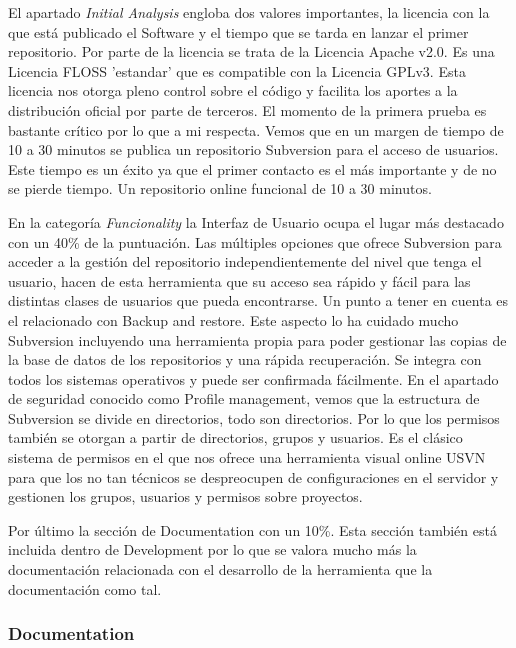 \documentclass[11pt]{scrartcl}
\begin{document}
\par El apartado \emph{Initial Analysis} engloba dos valores importantes, la licencia con la que está publicado el Software y el tiempo que se tarda en lanzar el primer repositorio. Por parte de la licencia se trata de la Licencia Apache v2.0. Es una Licencia FLOSS 'estandar' que es compatible con la Licencia GPLv3. Esta licencia nos otorga pleno control sobre el c\'odigo y facilita los aportes a la distribuci\'on oficial por parte de terceros.
El momento de la primera prueba es bastante cr\'itico por lo que a mi respecta. Vemos que en un margen de tiempo de 10 a 30 minutos se publica un repositorio Subversion para el acceso de usuarios. Este tiempo es un \'exito ya que el primer contacto es el m\'as importante y de no se pierde tiempo. Un repositorio online funcional de 10 a 30 minutos.

\par En la categor\'ia \emph{Funcionality} la Interfaz de Usuario ocupa el lugar m\'as destacado con un 40\% de la puntuaci\'on. Las m\'ultiples opciones que ofrece Subversion para acceder a la gesti\'on del repositorio independientemente del nivel que tenga el usuario, hacen de esta herramienta que su acceso sea r\'apido y f\'acil para las distintas clases de usuarios que pueda encontrarse.
Un punto a tener en cuenta es el relacionado con Backup and restore. Este aspecto lo ha cuidado mucho Subversion incluyendo una herramienta propia para poder gestionar las copias de la base de datos de los repositorios y una r\'apida recuperaci\'on. Se integra con todos los sistemas operativos y puede ser confirmada f\'acilmente.
En el apartado de seguridad conocido como Profile management, vemos que la estructura de Subversion se divide en directorios, todo son directorios. Por lo que los permisos tambi\'en se otorgan a partir de directorios, grupos y usuarios. Es el cl\'asico sistema de permisos en el que nos ofrece una herramienta visual online USVN para que los no tan t\'ecnicos se despreocupen de configuraciones en el servidor y gestionen los grupos, usuarios y permisos sobre proyectos.

\par Por \'ultimo la secci\'on de Documentation con un 10\%. Esta secci\'on tambi\'en est\'a incluida dentro de Development por lo que se valora mucho m\'as la documentaci\'on relacionada con el desarrollo de la herramienta que la documentaci\'on como tal.

\subsubsection{Documentation}
\end{document}
